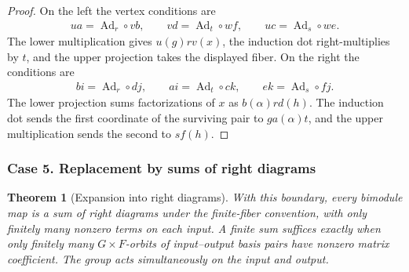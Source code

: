 \documentclass[11pt,a4paper]{article}
\numberwithin{equation}{section}
\newtheorem{theorem}{Theorem}[section]
\theoremstyle{definition}
\begin{document}
\begin{proof}
On the left the vertex conditions are
\[
 \begin{gathered}
 ua=\operatorname{Ad}_r\circ vb,\qquad
 vd=\operatorname{Ad}_t\circ wf,\qquad
 uc=\operatorname{Ad}_s\circ we .
 \end{gathered}
\]
The lower multiplication gives \(u(g)r v(x)\), the induction dot
right-multiplies by \(t\), and the upper projection takes the displayed
fiber. On the right the conditions are
\[
 \begin{gathered}
 bi=\operatorname{Ad}_r\circ dj,\qquad
 ai=\operatorname{Ad}_t\circ ck,\qquad
 ek=\operatorname{Ad}_s\circ fj .
 \end{gathered}
\]
The lower projection sums factorizations of \(x\) as \(b(\alpha)r d(h)\).
The induction dot sends the first coordinate of the surviving pair
to \(ga(\alpha)t\), and the upper multiplication sends the second
to \(s f(h)\).
\end{proof}

\subsubsection{Case 5. Replacement by sums of right diagrams}

\begin{theorem}[Expansion into right diagrams]\label{thm:three-orbits}
With this boundary, every bimodule map is a sum of right diagrams
under the finite-fiber convention, with only finitely many nonzero
terms on each input. A finite sum suffices exactly when only
finitely many \(G\times F\)-orbits of input--output basis pairs
have nonzero matrix coefficient. The group acts simultaneously
on the input and output.
\end{theorem}
\end{document}
